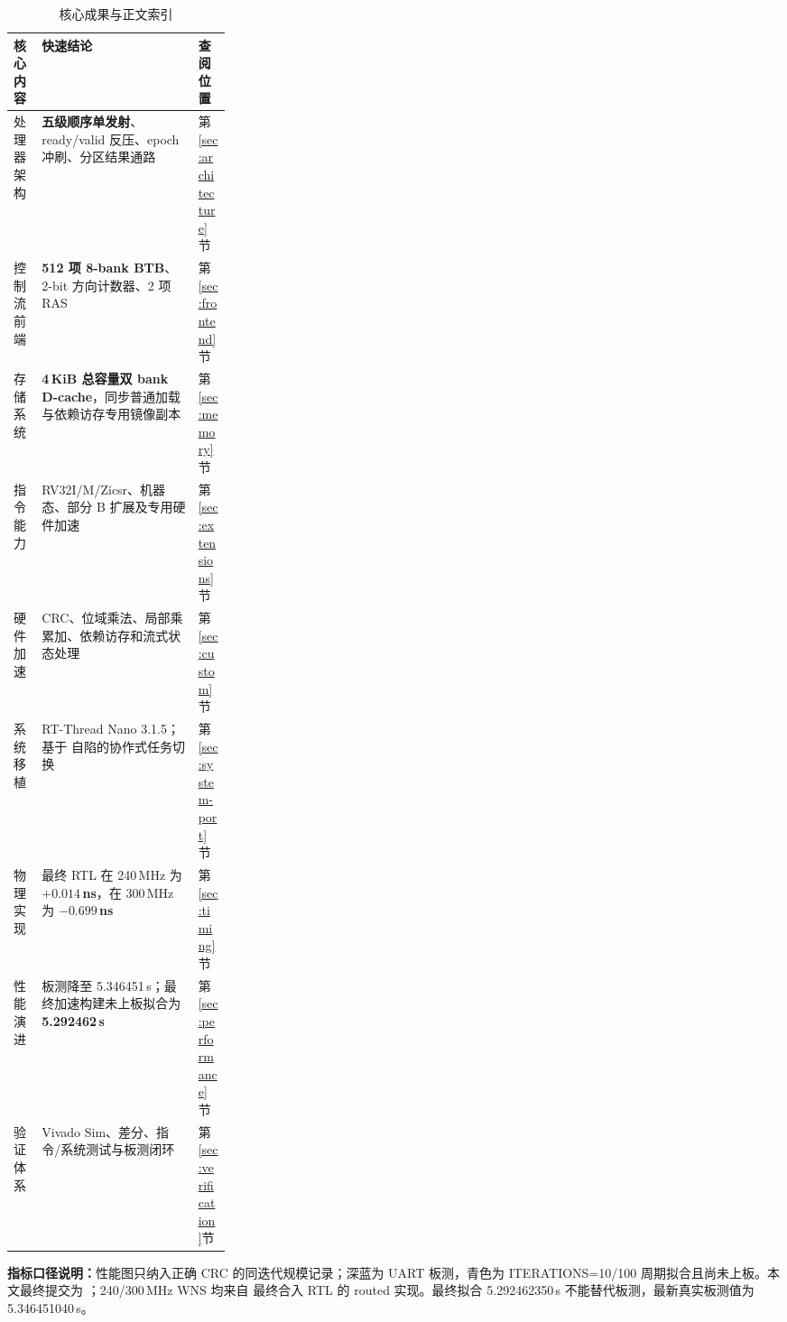 \begin{table}[H]
\centering
\caption{核心成果与正文索引}
\small
\begin{tabularx}{\linewidth}{@{}p{0.13\linewidth}Yp{0.15\linewidth}@{}}
\toprule
\textbf{核心内容}&\textbf{快速结论}&\textbf{查阅位置}\\\midrule
处理器架构&\textbf{五级顺序单发射}、ready/valid 反压、epoch 冲刷、分区结果通路&第\ref{sec:architecture}节\\
控制流前端&\textbf{512 项 8-bank BTB}、2-bit 方向计数器、2 项 RAS&第\ref{sec:frontend}节\\
存储系统&\textbf{4\,KiB 总容量双 bank D-cache}，同步普通加载与依赖访存专用镜像副本&第\ref{sec:memory}节\\
指令能力&RV32I/M/Zicsr、机器态、部分 B 扩展及专用硬件加速&第\ref{sec:extensions}节\\
硬件加速&CRC、位域乘法、局部乘累加、依赖访存和流式状态处理&第\ref{sec:custom}节\\
系统移植&RT-Thread Nano 3.1.5；基于  自陷的协作式任务切换&第\ref{sec:system-port}节\\
物理实现&最终 RTL 在 240\,MHz 为 \textbf{$+0.014$\,ns}，在 300\,MHz 为 \textbf{$-0.699$\,ns}&第\ref{sec:timing}节\\
性能演进&板测降至 5.346451\,s；最终加速构建未上板拟合为 \textbf{5.292462\,s}&第\ref{sec:performance}节\\
验证体系&Vivado Sim、差分、指令/系统测试与板测闭环&第\ref{sec:verification}节\\
\bottomrule
\end{tabularx}
\end{table}

\noindent\textbf{指标口径说明：}性能图只纳入正确 CRC 的同迭代规模记录；深蓝为 UART 板测，青色为
ITERATIONS=10/100 周期拟合且尚未上板。本文最终提交为 ；240/300\,MHz WNS 均来自
最终合入 RTL 的 routed 实现。最终拟合 5.292462350\,s 不能替代板测，最新真实板测值为
5.346451040\,s。
\clearpage
